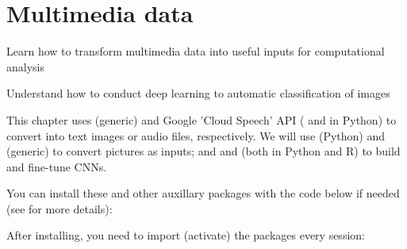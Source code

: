 \chapter{Multimedia data}
\label{chap:image}

\begin{abstract}{Abstract}
Digitally collected data often does not only contain texts, but also audio, images and videos. Instead of using only textual features as we did in previous chapters, we could as well use, for instance, pixel values
to analyze images. First, we will see how to use existing libraries, commercial services or API's to conduct multimedia analysis (i.e. optical character recognition, speech-to-text or object recognition). Then we will show how to store, represent and convert image data in order to use it as an input in our computational analysis.  We will focus on image analysis using machine learning classification techniques based on deep learning, and will explain how to build (or fine-tune) a Convolutional Neural Network (CNN) by ourselves. 
\end{abstract}


\begin{objectives}
\item Learn how to transform multimedia data into useful inputs for computational analysis
\item Understand how to conduct deep learning to automatic classification of images
\end{objectives}

\begin{feature}
This chapter uses  (generic) and  Google 'Cloud Speech' API ( and  in Python) to convert into text images or audio files, respectively. We will use  (Python) and  (generic) to convert pictures as inputs; and  and  (both in Python and R) to build and fine-tune CNNs. 

You can install these and other auxillary packages with the code below if needed  (see  for more details):


\noindent After installing, you need to import (activate) the packages every session:


\end{feature}









